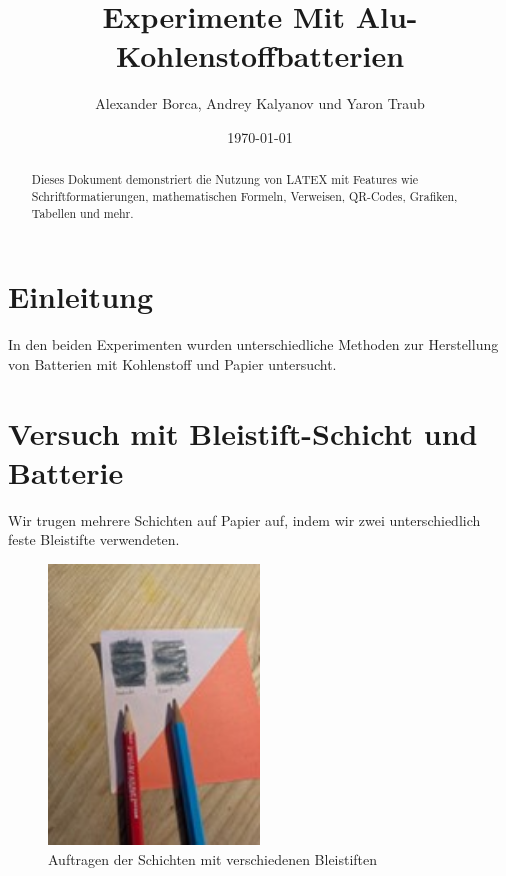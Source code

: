 \documentclass[a4paper,12pt]{article}
\begin{document}
\title{Experimente Mit Alu- Kohlenstoffbatterien}
\author{Alexander Borca, Andrey Kalyanov und Yaron Traub}
\date{\today}
\maketitle

\begin{abstract}
\noindent Dieses Dokument demonstriert die Nutzung von LATEX mit Features wie Schriftformatierungen, mathematischen Formeln, Verweisen, QR-Codes, Grafiken, Tabellen und mehr.
\end{abstract}

\tableofcontents
\newpage

\listoffigures
\newpage

\section{Einleitung}
In den beiden Experimenten wurden unterschiedliche Methoden zur Herstellung von Batterien mit Kohlenstoff und Papier untersucht.

\section{Versuch mit Bleistift-Schicht und Batterie}

Wir trugen mehrere Schichten auf Papier auf, indem wir zwei unterschiedlich feste Bleistifte verwendeten.

\begin{figure}[h!]
\centering
\includegraphics[width=0.5\textwidth]{Bild1} %
\caption{Auftragen der Schichten mit verschiedenen Bleistiften}
\label{fig:bild1}
\end{figure}
\end{document}
